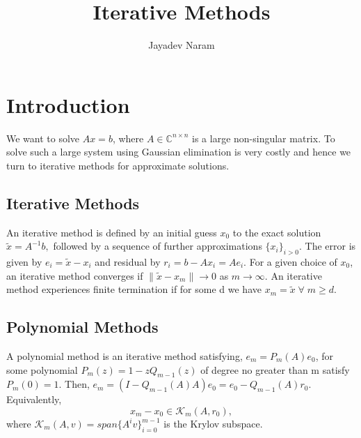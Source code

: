 \documentclass[10pt,a4paper]{article}
\author{Jayadev Naram}
\title{Iterative Methods}
\begin{document}
\maketitle 

\maketitle
 
\tableofcontents

\newpage

  
\newtheorem{theorem}{Theorem}
\newtheorem{corollary}{Corollary}[theorem]
\newtheorem{lemma}[theorem]{Lemma}
\newtheorem{definition}{Definition}
\newtheorem*{remark}{Remark}
\newtheorem{proposition}{Proposition}

\section{Introduction}

We want to solve $Ax=b$, where $A\in\mathbb{C}^{n\times n}$ is a large non-singular matrix. To solve such a large system using Gaussian elimination is very costly and hence we turn to iterative methods for approximate solutions.

\subsection{Iterative Methods}
An iterative method is defined by an initial guess $x_0$ to the exact solution $\tilde{x}=A^{-1}b,$ followed by a sequence of further approximations $\{x_i\}_{i>0}$. The error is given by $e_i=\tilde{x}-x_i$ and residual by $r_i=b-Ax_i=Ae_i.$ For a given choice of $x_0$, an iterative method converges if $\|\tilde{x}-x_m\|\rightarrow 0$ as $m\rightarrow \infty.$ An iterative method experiences finite termination if for some d we have $x_m=\tilde{x}\;\forall\;m\ge d.$

\subsection{Polynomial Methods}
A polynomial method is an iterative method satisfying, $e_m=P_m(A)e_0$, for some polynomial $P_m(z)=1-zQ_{m-1}(z)$ of degree no greater than m satisfy $P_m(0)=1$. Then, $e_m=(I-Q_{m-1}(A)A)e_0=e_0-Q_{m-1}(A)r_0.$ Equivalently,
$$x_m-x_0\in\mathcal{K}_m(A,r_0),$$
where $\mathcal{K}_m(A,v)=span\{A^iv\}^{m-1}_{i=0}$ is the Krylov subspace.
\end{document}
